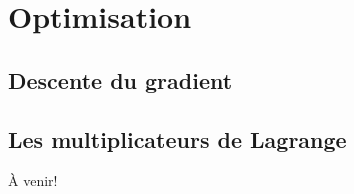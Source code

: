 \chapter{Optimisation}

\section{Descente du gradient}


\section{Les multiplicateurs de Lagrange}

À venir!

